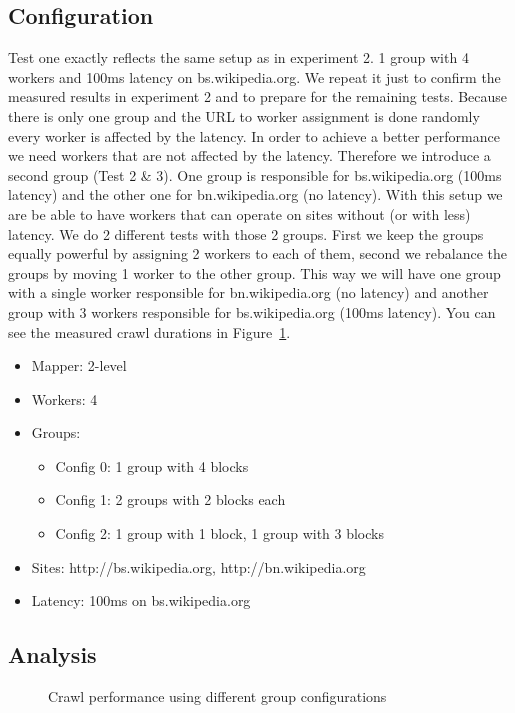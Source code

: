 \subsection{Configuration}
Test one exactly reflects the same setup as in experiment 2. 1 group with 4 workers and 100ms latency on bs.wikipedia.org. We repeat it just to confirm the measured results in experiment 2 and to prepare for the remaining tests. Because there is only one group and the URL to worker assignment is done randomly every worker is affected by the latency. In order to achieve a better performance we need workers that are not affected by the latency. Therefore we introduce a second group (Test 2 \& 3). One group is responsible for bs.wikipedia.org (100ms latency) and the other one for bn.wikipedia.org (no latency). With this setup we are be able to have workers that can operate on sites without (or with less) latency. We do 2 different tests with those 2 groups. First we keep the groups equally powerful by assigning 2 workers to each of them, second we rebalance the groups by moving 1 worker to the other group. This way we will have one group with a single worker responsible for bn.wikipedia.org (no latency) and another group with 3 workers responsible for bs.wikipedia.org (100ms latency). You can see the measured crawl durations in Figure~\ref{plot:exp_003}.
\begin{itemize}
  \item Mapper: 2-level
  \item Workers: 4
  \item Groups:
    \begin{itemize}
      \item Config 0: 1 group with 4 blocks
      \item Config 1: 2 groups with 2 blocks each
      \item Config 2: 1 group with 1 block, 1 group with 3 blocks
    \end{itemize}
  \item Sites: http://bs.wikipedia.org, http://bn.wikipedia.org
  \item Latency: 100ms on bs.wikipedia.org
\end{itemize}

\subsection{Analysis}

\begin{figure}
\centering
\caption{Crawl performance using different group configurations}
\label{plot:exp_003}
\end{figure}
